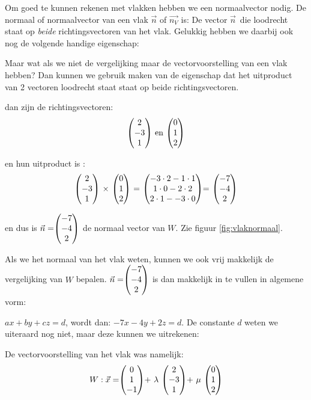 Om goed te kunnen rekenen met vlakken hebben we een normaalvector nodig.
\label{vlaknormaal}
{De normaal of normaalvector van een vlak $\vec{n}$ of  $\overrightarrow{n_{V}}$ is: De vector $ \vec{n} $\ die loodrecht staat op \textit{beide} richtingsvectoren van het vlak. Gelukkig hebben we daarbij ook nog de volgende handige eigenschap:}



Maar wat als we niet de vergelijking maar de vectorvoorstelling van een vlak hebben? Dan kunnen we gebruik maken van de eigenschap dat  het uitproduct van 2 vectoren loodrecht staat staat op beide richtingsvectoren. 

dan zijn de richtingsvectoren: \[\vecdrie{2}{-3}{1} \text{ en } \vecdrie{0}{1}{2} \]
 
en hun uitproduct is : \[
 \vecdrie{2}{-3}{1} \ \times \  \vecdrie{0}{1}{2}  \ = \ \vecdrie{-3\cdot2-1\cdot1}{1\cdot0-2\cdot2}{2\cdot1--3\cdot0} = \ \vecdrie{-7}{-4}{2} 
\]
 
en dus is $ \vec{n} = \vecdrie{-7}{-4}{2}  $ de normaal vector van $ W $.  Zie figuur  \ref{fig:vlaknormaal}.


Als we het normaal van het vlak weten, kunnen we ook vrij makkelijk de vergelijking van $ W $ bepalen. $\vec{n} = \vecdrie{-7}{-4}{2} $ is dan makkelijk in te vullen in algemene vorm: 

$ax + by + cz = d$, wordt dan: $ -7x-4y+2z = d $. De constante $d$ weten we uiteraard nog niet, maar deze kunnen we uitrekenen: 

De vectorvoorstelling van het vlak was namelijk: 
\[
    W: \vec{x} = \vecdrie{0}{1}{-1} +\ \lambda\ \vecdrie{2}{-3}{1} +\ \mu\ \vecdrie{0}{1}{2} 
\]

